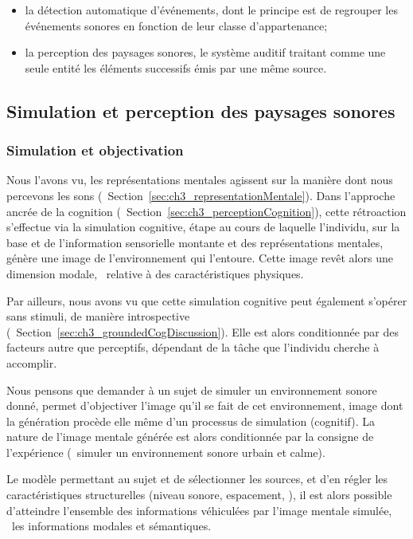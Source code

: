 \begin{itemize}
\item la détection automatique d'événements, dont le principe est de regrouper les événements sonores en fonction de leur classe d'appartenance;
\item la perception des paysages sonores, le système auditif traitant comme une seule entité les éléments successifs émis par une même source.
\end{itemize}

\subsection{Simulation et perception des paysages sonores}

\subsubsection{Simulation et objectivation}

Nous l'avons vu, les représentations mentales agissent sur la manière dont nous percevons les sons (\cf~Section~\ref{sec:ch3_representationMentale}). Dans l'approche ancrée de la cognition (\cf~Section~\ref{sec:ch3_perceptionCognition}), cette rétroaction s'effectue via la simulation cognitive, étape au cours de laquelle l'individu, sur la base et de l'information sensorielle montante et des représentations mentales, génère une image de l'environnement qui l'entoure. Cette image revêt alors une dimension modale, \ie~relative à des caractéristiques physiques.

Par ailleurs, nous avons vu que cette simulation cognitive peut également s'opérer sans stimuli, de manière introspective (\cf~Section~\ref{sec:ch3_groundedCogDiscussion}). Elle est alors conditionnée par des facteurs autre que perceptifs, dépendant de la tâche que l'individu cherche à accomplir.

Nous pensons que demander à un sujet de simuler un environnement sonore donné, permet d'objectiver l'image qu'il se fait de cet environnement, image dont la génération procède elle même d'un processus de simulation (cognitif). La nature de l'image mentale générée est alors conditionnée par la consigne de l'expérience (\eg~simuler un environnement sonore urbain et calme).

Le modèle permettant au sujet et de sélectionner les sources, et d'en régler les caractéristiques structurelles (niveau sonore, espacement, \etc), il est alors possible d'atteindre l'ensemble des informations véhiculées par l'image mentale simulée, \ie~les informations modales et sémantiques.

